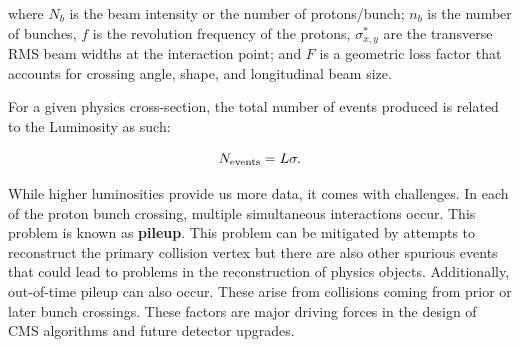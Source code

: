 where $N_{b}$ is the beam intensity or the number of protons/bunch; $n_{b}$ is the number of bunches, $f$ is the revolution frequency of the protons, $\sigma^{*}_{x,y}$ are the transverse RMS beam widths at the interaction point; and $F$ is a geometric loss factor that accounts for crossing angle, shape, and longitudinal beam size.


For a given physics cross-section, the total number of events produced is related to the Luminosity as such:

\begin{equation}
    N_{\textnormal{events} } = L \sigma.
\end{equation}

While higher luminosities provide us more data, it comes with challenges. In each of the proton bunch crossing, multiple simultaneous interactions occur. This problem is known as \textbf{pileup}. This problem can be mitigated by attempts to reconstruct the primary collision vertex but there are also other spurious events that could lead to problems in the reconstruction of physics objects. Additionally, out-of-time pileup can also occur. These arise from collisions coming from prior or later bunch crossings. These factors are major driving forces in the design of CMS algorithms and future detector upgrades. 


